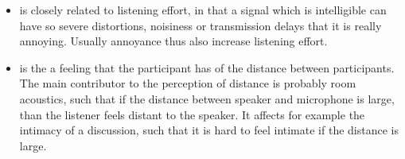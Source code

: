 \documentclass[letterpaper,10pt,english]{jupyterBook}
\begin{document}
\begin{itemize}
\item {} 
\sphinxAtStartPar
{} is closely related to listening effort, in that a signal
which is intelligible can have so severe distortions, noisiness or
transmission delays that it is really annoying. Usually annoyance
thus also increase listening effort.

\item {} 
\sphinxAtStartPar
{} is the a feeling that the participant has
of the distance between participants. The main contributor to the
perception of distance is probably room acoustics, such that if the
distance between speaker and microphone is large, than the listener
feels distant to the speaker. It affects for example the intimacy of
a discussion, such that it is hard to feel intimate if the distance
is large.

\end{itemize}
\end{document}
